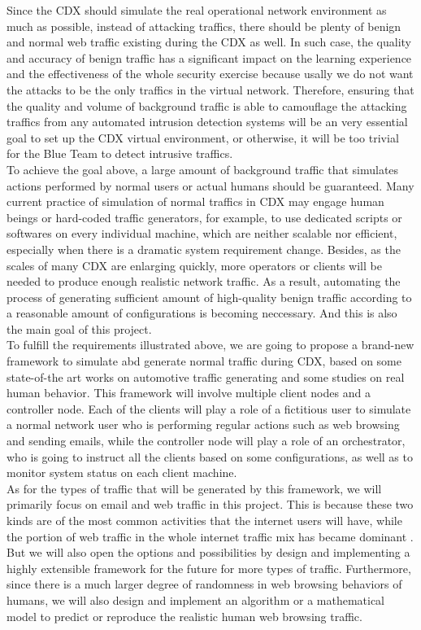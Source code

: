 \documentclass[12pt]{report}
\begin{document}
Since the CDX should simulate the real operational network environment as much as possible, instead of attacking traffics, there should be plenty of benign and normal web traffic existing during the CDX as well. In such case, the quality and accuracy of benign traffic has a significant impact on the learning experience and the effectiveness of the whole security exercise because usally we do not want the attacks to be the only traffics in the virtual network. Therefore, ensuring that the quality and volume of background traffic is able to camouflage the attacking traffics from any automated intrusion detection systems will be an very essential goal to set up the CDX virtual environment, or otherwise, it will be too trivial for the Blue Team to detect intrusive traffics.\\

To achieve the goal above, a large amount of background traffic that simulates actions performed by normal users or actual humans should be guaranteed. Many current practice of simulation of normal traffics in CDX may engage human beings or hard-coded traffic generators, for example, to use dedicated scripts or softwares on every individual machine, which are neither scalable nor efficient, especially when there is a dramatic system requirement change. Besides, as the scales of many CDX are enlarging quickly, more operators or clients will be needed to produce enough realistic network traffic. As a result, automating the process of generating sufficient amount of high-quality benign traffic according to a reasonable amount of configurations is becoming neccessary. And this is also the main goal of this project.\\

To fulfill the requirements illustrated above, we are going to propose a brand-new framework to simulate abd generate normal traffic during CDX, based on some state-of-the art works on automotive traffic generating and some studies on real human behavior. This framework will involve multiple client nodes and a controller node. Each of the clients will play a role of a fictitious user to simulate a normal network user who is performing regular actions such as web browsing and sending emails, while the controller node will play a role of an orchestrator, who is going to instruct all the clients based on some configurations, as well as to monitor system status on each client machine.\\

As for the types of traffic that will be generated by this framework, we will primarily focus on email and web traffic in this project. This is because these two kinds are of the most common activities that the internet users will have, while the portion of web traffic in the whole internet traffic mix has became dominant \citep{IATMA}. But we will also open the options and possibilities by design and implementing a highly extensible framework for the future for more types of traffic. Furthermore, since there is a much larger degree of randomness in web browsing behaviors of humans, we will also design and implement an algorithm or a mathematical model to predict or reproduce the realistic human web browsing traffic.\\
\end{document}
